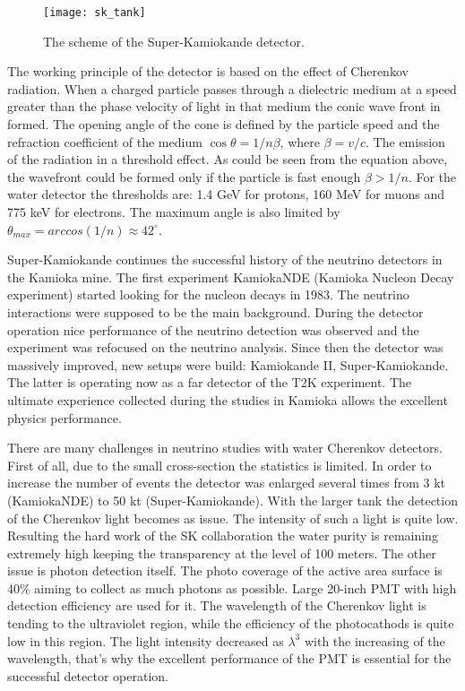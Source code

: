 \documentclass[../main.tex]{subfiles}
\begin{document}
\begin{figure}[!ht]
  \centering
  \texttt{[image: sk\_tank]}
  \caption{The scheme of the Super-Kamiokande detector.}
  \label{fig:t2k:sk}
\end{figure}

The working principle of the detector is based on the effect of Cherenkov radiation. When a charged particle passes through a dielectric medium at a speed greater than the phase velocity of light in that medium the conic wave front in formed. The opening angle of the cone is defined by the particle speed and the refraction coefficient of the medium $\cos{\theta}=1/n\beta$, where $\beta=v/c$. The emission of the radiation in a threshold effect. As could be seen from the equation above, the wavefront could be formed only if the particle is fast enough $\beta>1/n$. For the water detector the thresholds are: 1.4 GeV for protons, 160 MeV for muons and 775 keV for electrons. The maximum angle is also limited by $\theta_{max}=arccos(1/n)\approx42^\circ$.

Super-Kamiokande continues the successful history of the neutrino detectors in the Kamioka mine. The first experiment KamiokaNDE (Kamioka Nucleon Decay experiment) started looking for the nucleon decays in 1983. The neutrino interactions were supposed to be the main background. During the detector operation nice performance of the neutrino detection was observed and the experiment was refocused on the neutrino analysis. Since then the detector was massively improved, new setups were build: Kamiokande II, Super-Kamiokande. The latter is operating now as a far detector of the T2K experiment. The ultimate experience collected during the studies in Kamioka allows the excellent physics performance.

There are many challenges in neutrino studies with water Cherenkov detectors. First of all, due to the small cross-section the statistics is limited. In order to increase the number of events the detector was enlarged several times from 3 kt (KamiokaNDE) to 50 kt (Super-Kamiokande). With the larger tank the detection of the Cherenkov light becomes as issue. The intensity of such a light is quite low. Resulting the hard work of the SK collaboration the water purity is remaining extremely high keeping the transparency at the level of 100 meters. The other issue is photon detection itself. The photo coverage of the active area surface is 40\% aiming to collect as much photons as possible. Large 20-inch PMT with high detection efficiency are used for it. The wavelength of the Cherenkov light is tending to the ultraviolet region, while the efficiency of the photocathods is quite low in this region. The light intensity decreased as $\lambda^3$ with the increasing of the wavelength, that's why the excellent performance of the PMT is essential for the successful detector operation.
\end{document}
